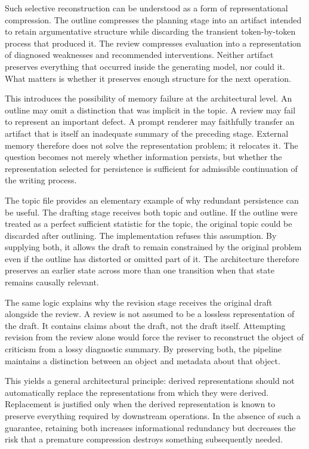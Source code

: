 \documentclass[11pt]{article}
\begin{document}
Such selective reconstruction can be understood as a form of representational compression. The outline compresses the planning stage into an artifact intended to retain argumentative structure while discarding the transient token-by-token process that produced it. The review compresses evaluation into a representation of diagnosed weaknesses and recommended interventions. Neither artifact preserves everything that occurred inside the generating model, nor could it. What matters is whether it preserves enough structure for the next operation.

This introduces the possibility of memory failure at the architectural level. An outline may omit a distinction that was implicit in the topic. A review may fail to represent an important defect. A prompt renderer may faithfully transfer an artifact that is itself an inadequate summary of the preceding stage. External memory therefore does not solve the representation problem; it relocates it. The question becomes not merely whether information persists, but whether the representation selected for persistence is sufficient for admissible continuation of the writing process.

The topic file provides an elementary example of why redundant persistence can be useful. The drafting stage receives both topic and outline. If the outline were treated as a perfect sufficient statistic for the topic, the original topic could be discarded after outlining. The implementation refuses this assumption. By supplying both, it allows the draft to remain constrained by the original problem even if the outline has distorted or omitted part of it. The architecture therefore preserves an earlier state across more than one transition when that state remains causally relevant.

The same logic explains why the revision stage receives the original draft alongside the review. A review is not assumed to be a lossless representation of the draft. It contains claims about the draft, not the draft itself. Attempting revision from the review alone would force the reviser to reconstruct the object of criticism from a lossy diagnostic summary. By preserving both, the pipeline maintains a distinction between an object and metadata about that object.

This yields a general architectural principle: derived representations should not automatically replace the representations from which they were derived. Replacement is justified only when the derived representation is known to preserve everything required by downstream operations. In the absence of such a guarantee, retaining both increases informational redundancy but decreases the risk that a premature compression destroys something subsequently needed.
\end{document}
